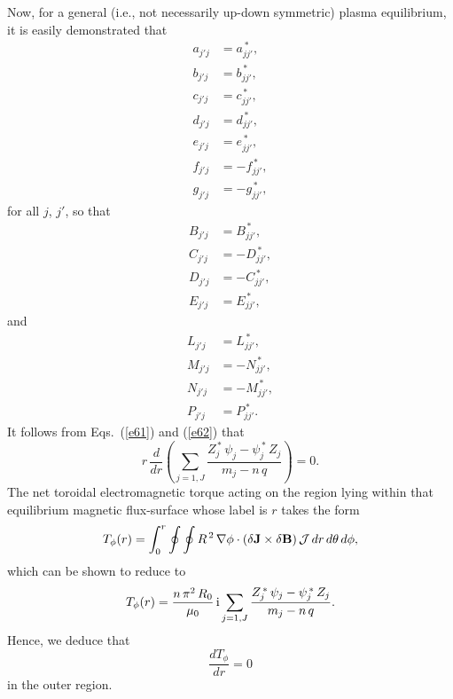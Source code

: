\documentclass[12pt,prb,aps,notitlepage]{revtex4-1}
\begin{document}
Now, for a general (i.e., not necessarily up-down symmetric) plasma equilibrium, it is easily demonstrated that
\begin{align}
a_{j'j}&= a_{jj'}^{\,\ast},\\[0.5ex]
b_{j'j}&= b_{jj'}^{\,\ast},\\[0.5ex]
c_{j'j}&= c_{jj'}^{\,\ast},\\[0.5ex]
d_{j'j}&= d_{jj'}^{\,\ast},\\[0.5ex]
e_{j'j}&= e_{jj'}^{\,\ast},\\[0.5ex]
f_{j'j}&= -f_{jj'}^{\,\ast},\\[0.5ex]
g_{j'j}&= -g_{jj'}^{\,\ast},
\end{align}
for all $j$, $j'$, 
 so that
\begin{align}
B_{j'j}&=B_{jj'}^{\,\ast},\\[0.5ex]
C_{j'j} &=-D_{jj'}^{\,\ast},\\[0.5ex]
D_{j'j} &=-C_{jj'}^{\,\ast},\\[0.5ex]
E_{j'j}&=E_{jj'}^{\,\ast},
\end{align}
and
\begin{align}
L_{j'j}&= L_{jj'}^{\,\ast},\\[0.5ex]
M_{j'j}&=-N_{jj'}^{\,\ast},\\[0.5ex]
N_{j'j}&=-M_{jj'}^{\,\ast},\\[0.5ex]
P_{j'j}&= P_{jj'}^{\,\ast}.
\end{align}
It follows from Eqs.~(\ref{e61}) and (\ref{e62}) that
\begin{equation}
r\,\frac{d}{dr}\!\left(\sum_{j=1,J}\frac{Z_j^{\,\ast}\,\psi_j-\psi_j^{\,\ast}\,Z_j}{m_j-n\,q}\right) = 0.
\end{equation}
The net toroidal electromagnetic torque acting on the region lying within that equilibrium magnetic flux-surface whose label is $r$ takes the
form
\begin{equation}\label{e83}
T_\phi(r) = \int_0^r \oint\oint R^{\,2}\,\nabla\phi\cdot(\delta {\bf J}\times \delta{\bf B})\,{\cal J}\,dr\,d\theta\,d\phi,\end{equation}
which can be shown to reduce to 
\begin{equation}\label{e83a}
T_\phi(r)= \frac{n\,\pi^2\,R_0}{\mu_0}\,{\rm i}\sum_{j=1,J}\frac{Z_j^{\,\ast}\,\psi_j-\psi_j^{\,\ast}\,Z_j}{m_j-n\,q}.
\end{equation}
Hence, we deduce that
\begin{equation}\label{e84}
\frac{dT_\phi}{dr} = 0
\end{equation}
in the outer region. 
\end{document}
